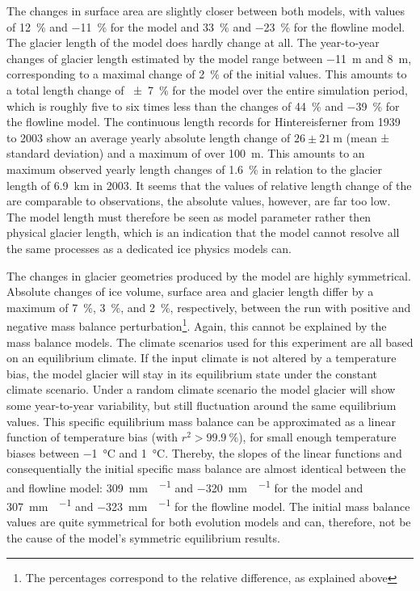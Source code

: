         The changes in surface area are slightly closer between both models, with values of \SI{+12}{\percent} and \SI{-11}{\percent} for the \vas{} model and \SI{+33}{\percent} and \SI{-23}{\percent} for the flowline model. The glacier length of the \vas{} model does hardly change at all. The year-to-year changes of glacier length estimated by the \vas{} model range between \SI{-11}{\meter} and \SI{+8}{\meter}, corresponding to a maximal change of \SI{2}{\percent} of the initial values. This amounts to a total length change of \SI{\pm7}{\percent} for the \vas{} model over the entire simulation period, which is roughly five to six times less than the changes of \SI{+44}{\percent} and \SI{-39}{\percent} for the flowline model. The continuous length records for Hintereisferner from 1939 to 2003 \citep{Leclercq2014} show an average yearly absolute length change of $26\pm{}\SI{21}{\meter}$ (mean ± standard deviation) and a maximum of over \SI{100}{\meter}. This amounts to an maximum observed yearly length changes of \SI{1.6}{\percent} in relation to the glacier length of \SI{6.9}{\kilo\meter} in 2003. It seems that the values of relative length change of the \vas{} are comparable to observations, the absolute values, however, are far too low. The model length must therefore be seen as model parameter rather then physical glacier length, which is an indication that the \vas{} model cannot resolve all the same processes as a dedicated ice physics models can.
        
        The changes in glacier geometries produced by the \vas{} model are highly symmetrical. Absolute changes of ice volume, surface area and glacier length differ by a maximum of \SI{7}{\percent}, \SI{3}{\percent}, and \SI{2}{\percent}, respectively, between the run with positive and negative mass balance perturbation\footnote{The percentages correspond to the relative difference, as explained above}.
        Again, this cannot be explained by the mass balance models. The climate scenarios used for this experiment are all based on an equilibrium climate. If the input climate is not altered by a temperature bias, the model glacier will stay in its equilibrium state under the constant climate scenario. Under a random climate scenario the model glacier will show some year-to-year variability, but still fluctuation around the same equilibrium values. This specific equilibrium mass balance can be approximated as a linear function of temperature bias (with $r^2 > \SI{99.9}{\percent}$), for small enough temperature biases between \SI{-1}{\celsius} and \SI{+1}{\celsius}. Thereby, the slopes of the linear functions and consequentially the initial specific mass balance are almost identical between the \vas{} and flowline model: \SI{+309}{\milli\meter\waterequivalent\per\year} and \SI{-320}{\milli\meter\waterequivalent\per\year} for the \vas{} model and \SI{+307}{\milli\meter\waterequivalent\per\year} and \SI{-323}{\milli\meter\waterequivalent\per\year} for the flowline model. The initial mass balance values are quite symmetrical for both evolution models and can, therefore, not be the cause of the \vas{} model's symmetric equilibrium results.
        
